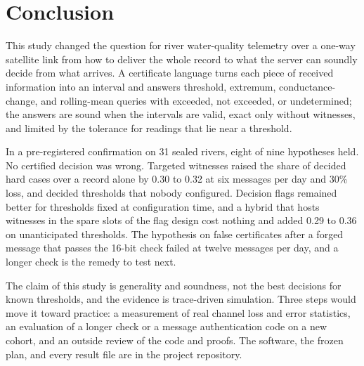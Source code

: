 \section{Conclusion}
\label{sec:conclusion}

This study changed the question for river water-quality telemetry over a one-way satellite link from how to deliver the whole record to what the server can soundly decide from what arrives. A certificate language turns each piece of received information into an interval and answers threshold, extremum, conductance-change, and rolling-mean queries with exceeded, not exceeded, or undetermined; the answers are sound when the intervals are valid, exact only without witnesses, and limited by the tolerance for readings that lie near a threshold.

In a pre-registered confirmation on 31 sealed rivers, eight of nine hypotheses held. No certified decision was wrong. Targeted witnesses raised the share of decided hard cases over a record alone by 0.30 to 0.32 at six messages per day and 30\% loss, and decided thresholds that nobody configured. Decision flags remained better for thresholds fixed at configuration time, and a hybrid that hosts witnesses in the spare slots of the flag design cost nothing and added 0.29 to 0.36 on unanticipated thresholds. The hypothesis on false certificates after a forged message that passes the 16-bit check failed at twelve messages per day, and a longer check is the remedy to test next.

The claim of this study is generality and soundness, not the best decisions for known thresholds, and the evidence is trace-driven simulation. Three steps would move it toward practice: a measurement of real channel loss and error statistics, an evaluation of a longer check or a message authentication code on a new cohort, and an outside review of the code and proofs. The software, the frozen plan, and every result file are in the project repository.
